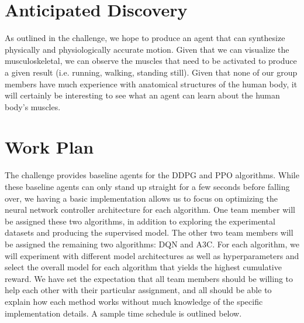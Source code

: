 \documentclass[journal,onecolumn]{IEEEtran}
\begin{document}
\section{Anticipated Discovery}
As outlined in the challenge, we hope to produce an agent that can synthesize physically and physiologically accurate motion. Given that we can visualize the musculoskeletal, we can observe the muscles that need to be activated to produce a given result (i.e. running, walking, standing still). Given that none of our group members have much experience with anatomical structures of the human body, it will certainly be interesting to see what an agent can learn about the human body's muscles. 
\section{Work Plan}
The challenge provides baseline agents for the DDPG and PPO algorithms. While these baseline agents can only stand up straight for a few seconds before falling over, we having a basic implementation allows us to focus on optimizing the neural network controller architecture for each algorithm. One team member will be assigned these two algorithms, in addition to exploring the experimental datasets and producing the supervised model. The other two team members will be assigned the remaining two algorithms: DQN and A3C. For each algorithm, we will experiment with different model architectures as well as hyperparameters and select the overall model for each algorithm that yields the highest cumulative reward. We have set the expectation that all team members should be willing to help each other with their particular assignment, and all should be able to explain how each method works without much knowledge of the specific implementation details. A sample time schedule is outlined below.
\end{document}
